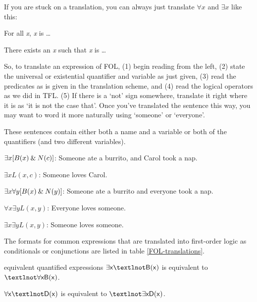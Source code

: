 If you are stuck on a translation, you can always just translate $\forall x$ and $\exists x$ like this:
\begin{ebullet}
\item[] For all \textit{x}, \textit{x} is \ldots
\item[] There exists an \textit{x} such that \textit{x} is \ldots
\end{ebullet} 
So, to translate an expression of FOL, (1) begin reading from the left, (2) state the universal or existential quantifier and variable as just given, (3) read the predicates as is given in the translation scheme, and (4) read the logical operators as we did in TFL. (5) If there is a `not' sign somewhere, translate it right where it is as `it is not the case that'. Once you've translated the sentence this way, you may want to word it more naturally using `someone' or `everyone'.

These sentences contain either both a name and a variable or both of the quantifiers (and two different variables).
	
\begin{ebullet}
	\item[]$\exists x[B(x) \mathbin{\&} N(c)]$: Someone ate a burrito, and Carol took a nap.\smallskip
	\item[]$\exists xL(x,c)$: Someone loves Carol.\smallskip
	\item[]$\exists x \forall y[B(x) \mathbin{\&} N(y)]$: Someone ate a burrito and everyone took a nap.\smallskip
	\item[]$\forall x \exists yL(x,y)$: Everyone loves someone.\smallskip
	\item[]$\exists x \exists yL(x,y)$: Someone loves someone.
\end{ebullet}

\noindent The formats for common expressions that are translated into first-order logic as conditionals or conjunctions are listed in table \ref{FOL-translations}. 

\begin{factboxy-width}[width=8cm]{equivalent quantified expressions}
$\exists \meta{x} ¬\meta{B(x)} $ is equivalent to $¬\forall \meta{x B(x)}$.\medskip

$\forall \meta{x} ¬\meta{D(x)}$ is equivalent to $¬\exists \meta{x D(x)}$.
\end{factboxy-width}


